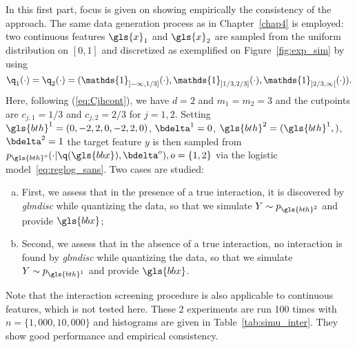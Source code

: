 In this first part, focus is given on showing empirically the consistency of the approach. The same data generation process as in Chapter~\ref{chap4} is employed: two continuous features $\gls{x}_1$ and $\gls{x}_2$ are sampled from the uniform distribution on $[0,1]$ and discretized as exemplified on Figure~\ref{fig:exp_sim} by using
\[\q_1(\cdot)=\q_2(\cdot) = (\mathds{1}_{]-\infty,1/3]}(\cdot),\mathds{1}_{]1/3,2/3]}(\cdot),\mathds{1}_{]2/3,\infty[}(\cdot)).\]
Here, following (\ref{eq:Cjhcont}), we have $d=2$ and $m_1=m_2=3$ and the cutpoints are $c_{j,1}=1/3$ and $c_{j,2}=2/3$ for $j=1,2$. Setting $\gls{bth}^{1}=(0,-2,2,0,-2,2,0)$, $\bdelta^{1} = 0$, $\gls{bth}^{2} = (\gls{bth}^{1},)$, $\bdelta^{2} = 1$ the target feature $y$ is then sampled from $p_{\gls{bth}^{o}}(\cdot | \q(\gls{bbx}), \bdelta^{o}), o = \{1,2\}$ via the logistic model~\eqref{eq:reglog_sans}. Two cases are studied:
\begin{enumerate}[(a)]
    \item First, we assess that in the presence of a true interaction, it is discovered by \textit{glmdisc} while quantizing the data, so that we simulate $Y \sim p_{\gls{bth}^{2}}$ and provide $\gls{bbx}$;
    \item Second, we assess that in the absence of a true interaction, no interaction is found by \textit{glmdisc} while quantizing the data, so that we simulate $Y \sim p_{\gls{bth}^{1}}$ and provide $\gls{bbx}$.
\end{enumerate}
Note that the interaction screening procedure is also applicable to continuous features, which is not tested here. These 2 experiments are run 100 times with $n = \{1{,}000,10{,}000\}$ and histograms are given in Table~\ref{tab:simu_inter}. They show good performance and empirical consistency.

